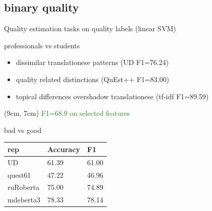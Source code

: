 \documentclass[11pt]{beamer} %
\begin{document}
\subsection{binary quality}

\begin{frame}{Quality estimation tasks on quality labels (linear SVM)}
	\begin{block}{professionals vs students}
		\begin{itemize}
			\item dissimilar translationese patterns (UD F1=76.24)
			\item quality related distinctions (QuEst++ F1=83.00)
			\item topical differences overshadow translationese (tf-idf F1=89.59)
		\end{itemize}
	\end{block}
	\begin{textblock*}{12cm}(9cm, 7cm) %
	{\scriptsize \textcolor{ForestGreen}{F1=68.9 on selected features}}
	\end{textblock*}
	\begin{exampleblock}{bad vs good}
		\begin{table}[H]
			\centering
			\begin{tabular}{l|ll}
				\toprule
				rep             & Accuracy & F1 \\
				\midrule
				UD              & 61.39 & 61.00 \\
				quest61         & 47.22 & 46.96 \\
				\midrule
				ruRoberta & 75.00 & 74.89 \\
				mdeberta3  & 78.33 & 78.14 \\
				\bottomrule
			\end{tabular}
		\end{table}
	
	\end{exampleblock}
\end{frame}
\end{document}
